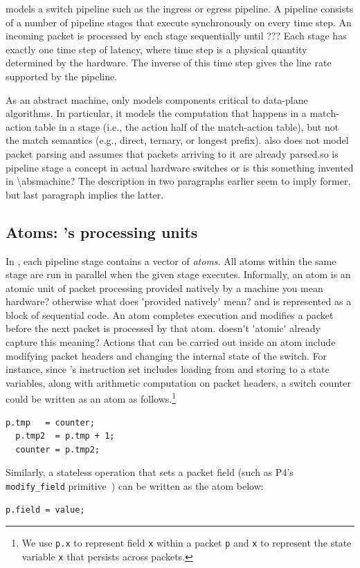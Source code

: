 \absmachine models a switch pipeline such as the ingress or egress pipeline. A
pipeline consists of a number of pipeline stages that execute synchronously on
every time step. An incoming packet is processed by each stage sequentially until \ac{???}
Each stage has exactly one time step of latency, where time step is a 
physical quantity determined by the hardware. The inverse of this
time step gives the line rate supported by the pipeline. 

As an abstract machine, \absmachine only models components critical to
data-plane algorithms. In particular, it models the computation that happens in
a match-action table in a stage (i.e., the action half of the match-action
table), but not the match semantics (e.g., direct, ternary, or longest prefix).
\absmachine also does not model packet parsing and assumes that packets
arriving to it are already parsed.\ac{so is pipeline stage a concept in actual
hardware switches or is this something invented in \absmachine? The description 
in two paragraphs earlier seem to imply former, but last paragraph implies the latter.}

\subsection{Atoms: \absmachine's processing units}

In \absmachine, each pipeline stage 
contains a vector of \textit{atoms}. All atoms within the same stage are
run in parallel when the given stage executes.
Informally, an atom is an atomic unit of packet
processing provided natively by a \absmachine machine \ac{you mean hardware? otherwise what
does 'provided natively' mean?} and is represented as a
block of sequential code. An atom completes execution and modifies a packet before
the next packet is processed by that atom. \ac{doesn't 'atomic' already capture this meaning?}
Actions that can be carried out inside an atom include modifying packet headers
and changing the internal state of the switch.
For instance, since \absmachine's instruction set includes loading from and storing to
a state variables, along with arithmetic computation on packet headers, a
switch counter could be written as an atom as follows.\footnote{We use
{\tt p.x} to represent field {\tt x} within a packet {\tt p} and {\tt x} to represent
  the state variable {\tt x} that persists across packets.}
  \begin{lstlisting}[style=customc, numbers=none, frame=none]
  p.tmp   = counter;
  p.tmp2  = p.tmp + 1;
  counter = p.tmp2;
  \end{lstlisting}
Similarly, a stateless operation that sets a packet field (such as P4's
{\tt modify\_field} primitive~\cite{p4spec}) can be written as the atom
below:
\begin{lstlisting}[style=customc, numbers=none, frame=none]
  p.field = value;
\end{lstlisting}

